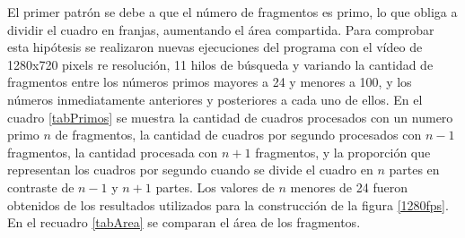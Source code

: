 El primer patrón se debe a que el número de fragmentos es primo, lo que obliga a
dividir el cuadro en franjas, aumentando el área compartida. Para comprobar esta
hipótesis se realizaron nuevas ejecuciones del programa con el vídeo de 1280x720
pixels re resolución, 11 hilos de búsqueda y variando la cantidad de fragmentos
entre los números primos mayores a 24 y menores a 100, y los números
inmediatamente anteriores y posteriores a cada uno de ellos. En el cuadro
\ref{tabPrimos} se muestra la cantidad de cuadros procesados con un numero primo
$n$ de fragmentos, la cantidad de cuadros por segundo procesados con $n-1$
fragmentos, la cantidad procesada con $n+1$ fragmentos, y la proporción que
representan los cuadros por segundo cuando se divide el cuadro en $n$ partes en
contraste de $n-1$ y $n+1$ partes. Los valores de $n$ menores de 24 fueron
obtenidos de los resultados utilizados para la construcción de la figura
\ref{1280fps}. En el recuadro \ref{tabArea} se comparan el área de los
fragmentos.

